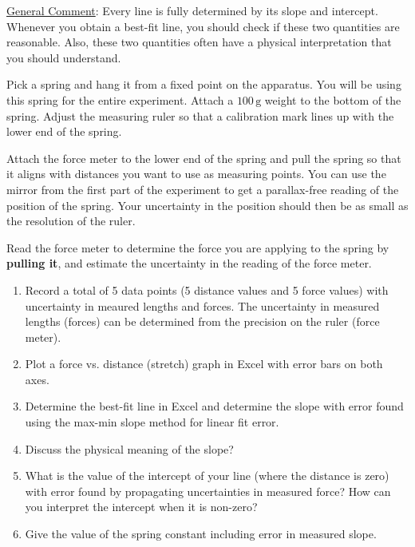 \underline{General Comment}: Every line is fully determined by its slope and intercept. Whenever you obtain a best-fit line, you should check if these two quantities are reasonable. Also, these two quantities often have a physical interpretation that you should understand. \myskip

Pick a spring and hang it from a fixed point on the apparatus. You will be using this spring for the entire experiment. Attach a $100\,\mathrm{g}$ weight to the bottom of the spring. Adjust the measuring ruler so that a calibration mark lines up with the lower end of the spring. \myskip

Attach the force meter to the lower end of the spring and pull the spring so that it aligns with distances you want to use as measuring points. You can use the mirror from the first part of the experiment to get a parallax-free reading of the position of the spring. Your uncertainty in the position should then be as small as the resolution of the ruler. \myskip

Read the force meter to determine the force you are applying to the spring by {\bf{pulling it}}, and estimate the uncertainty in the reading of the force meter. 

\begin{enumerate}
    \item Record a total of 5 data points (5 distance values and 5 force values) with uncertainty in meaured lengths and forces. The uncertainty in measured lengths (forces) can be determined from the precision on the ruler (force meter).
    \item Plot a force vs. distance (stretch) graph in Excel with error bars on both axes.
    \item Determine the best-fit line in Excel and determine the slope with error found using the max-min slope method for linear fit error.
    \item Discuss the physical meaning of the slope?
    \item What is the value of the intercept of your line (where the distance is zero) with error found by propagating uncertainties in measured force?  How can you interpret the intercept when it is non-zero?
    \item Give the value of the spring constant including error in measured slope.
\end{enumerate}

